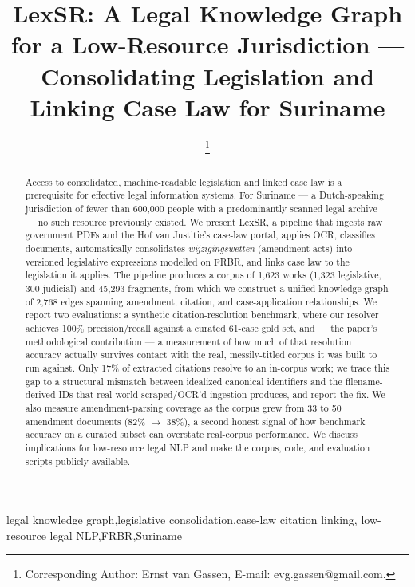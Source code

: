 \documentclass{IOS-Book-Article}
\def\hb{\hbox to 11.5 cm{}}
\begin{document}
\pagestyle{headings}
\def\thepage{}
\begin{frontmatter}

\title{LexSR: A Legal Knowledge Graph for a Low-Resource Jurisdiction ---\\
Consolidating Legislation and Linking Case Law for Suriname}

\markboth{}{2026\hb}

\author[A]{ %
\thanks{Corresponding Author: Ernst van Gassen, E-mail: evg.gassen@gmail.com.}}

\address[A]{Independent researcher}

\begin{abstract}
Access to consolidated, machine-readable legislation and linked case law is a prerequisite
for effective legal information systems. For Suriname --- a Dutch-speaking jurisdiction of
fewer than 600,000 people with a predominantly scanned legal archive --- no such resource
previously existed. We present LexSR, a pipeline that ingests raw government PDFs and
the Hof van Justitie's case-law portal, applies OCR, classifies documents, automatically
consolidates \emph{wijzigingswetten} (amendment acts) into versioned legislative expressions
modelled on FRBR, and links case law to the legislation it applies. The pipeline produces a
corpus of 1,623 works (1,323 legislative, 300 judicial) and 45,293 fragments, from
which we construct a unified knowledge graph of 2,768 edges spanning amendment,
citation, and case-application relationships. We report two evaluations: a synthetic
citation-resolution benchmark, where our resolver achieves 100\% precision/recall against a
curated 61-case gold set, and --- the paper's methodological contribution --- a measurement of
how much of that resolution accuracy actually survives contact with the real, messily-titled
corpus it was built to run against. Only 17\% of extracted citations resolve to an
in-corpus work; we trace this gap to a structural mismatch between idealized
canonical identifiers and the filename-derived IDs that real-world scraped/OCR'd ingestion
produces, and report the fix. We also measure amendment-parsing coverage as the corpus grew
from 33 to 50 amendment documents (82\% $\rightarrow$ 38\%), a second honest signal of how
benchmark accuracy on a curated subset can overstate real-corpus performance. We discuss
implications for low-resource legal NLP and make the corpus, code, and evaluation scripts
publicly available.
\end{abstract}

\begin{keyword}
legal knowledge graph\sep legislative consolidation\sep case-law citation linking\sep
low-resource legal NLP\sep FRBR\sep Suriname
\end{keyword}
\end{frontmatter}
\end{document}
